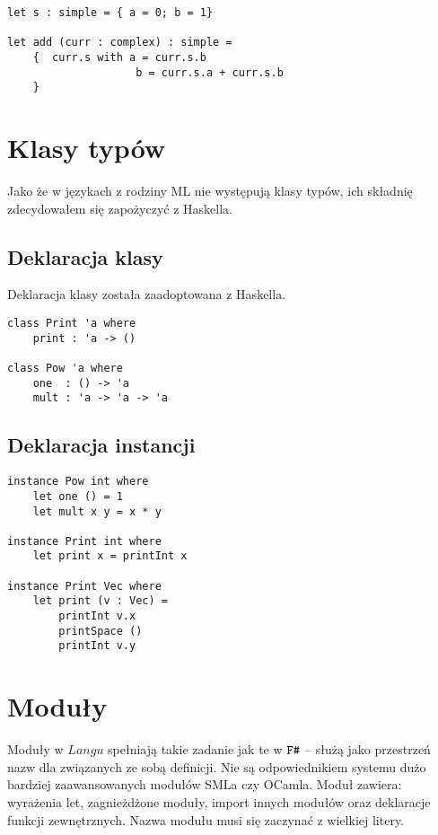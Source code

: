 \documentclass[declaration,shortabstract]{iithesis}
\begin{document}
\begin{lstlisting}[frame=single, caption=Uaktualnianie rekordu.]
let s : simple = { a = 0; b = 1}

let add (curr : complex) : simple = 
    {  curr.s with a = curr.s.b
                    b = curr.s.a + curr.s.b 
    }
\end{lstlisting}

\section{Klasy typów}

Jako że w językach z rodziny ML nie występują klasy typów, ich składnię
zdecydowałem się zapożyczyć z Haskella.

\subsection{Deklaracja klasy}

Deklaracja klasy została zaadoptowana z Haskella.

\begin{lstlisting}[frame=single, caption=Deklaracja klasy.]
class Print 'a where 
    print : 'a -> ()
  
class Pow 'a where 
    one  : () -> 'a
    mult : 'a -> 'a -> 'a
\end{lstlisting}

\subsection{Deklaracja instancji}

\begin{lstlisting}[frame=single, caption=Instancja klasy.]
instance Pow int where
    let one () = 1 
    let mult x y = x * y

instance Print int where 
    let print x = printInt x 

instance Print Vec where 
    let print (v : Vec) = 
        printInt v.x 
        printSpace ()
        printInt v.y
\end{lstlisting}

\section{Moduły}

Moduły w $Langu$ spełniają takie zadanie jak te w $\verb!F#!$ -- służą jako 
przestrzeń nazw dla związanych ze sobą definicji. Nie są odpowiednikiem 
systemu dużo bardziej zaawansowanych modułów SMLa czy OCamla.
Moduł zawiera: wyrażenia let, zagnieżdżone moduły, import innych 
modułów oraz deklaracje funkcji zewnętrznych. Nazwa modułu musi się zaczynać 
z wielkiej litery. 
\end{document}
